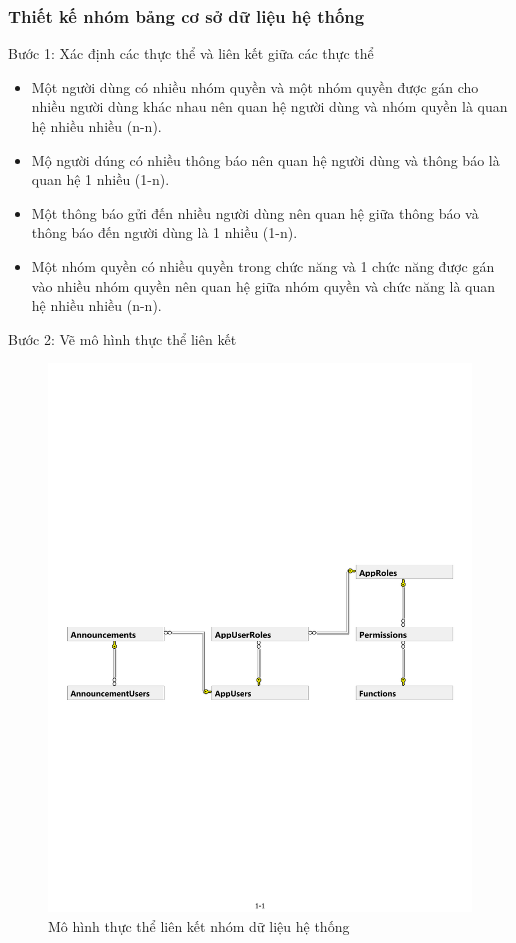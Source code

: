 \subsubsection{Thiết kế nhóm bảng cơ sở dữ liệu hệ thống}
Bước 1: Xác định các thực thể và liên kết giữa các thực thể 
\begin{itemize}
\item Một người dùng có nhiều nhóm quyền và một nhóm quyền được gán cho nhiều người dùng khác nhau nên quan hệ người dùng và nhóm quyền là quan hệ nhiều nhiều (n-n).
\item Mộ người dúng có nhiều thông báo nên quan hệ người dùng và thông báo là quan hệ 1 nhiều (1-n).
\item Một thông báo gửi đến nhiều người dùng nên quan hệ giữa thông báo và thông báo đến người dùng là 1 nhiều (1-n).
\item Một nhóm quyền có nhiều quyền trong chức năng và 1 chức năng được gán vào nhiều nhóm quyền nên quan hệ giữa nhóm quyền và chức năng là quan hệ nhiều nhiều (n-n).
\end{itemize}
Bước 2: Vẽ mô hình thực thể liên kết
\begin{center}
    \begin{figure}[h]
    \begin{center}
     \includegraphics[scale=0.65]{image/E-RSystem.pdf}
    \end{center}
    \caption{Mô hình thực thể liên kết nhóm dữ liệu hệ thống}
    \label{refhinh3_11}
    \end{figure}
\end{center}
